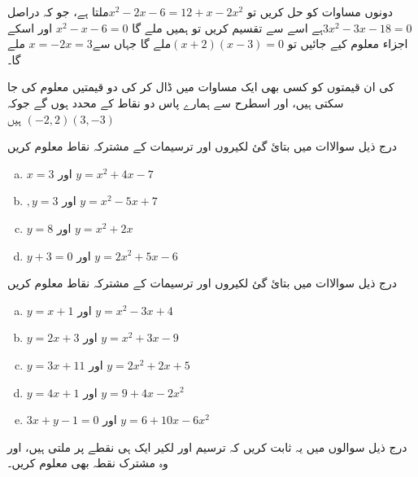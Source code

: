 دونوں مساوات کو حل کریں تو \(   x^{2}-2x-6=12+x-2x^{2}  \)ملتا ہے، جو کہ دراصل \(     3x^{2}-3x-18=0   \)ہے  اسے سے تقسیم کریں تو ہمیں ملے گا \(        x^{2}-x-6=0   \) اور اسکے اجزاء معلوم کیے جائیں تو   \(        (x+2)(x-3)=0   \)ملے گا جہاں سے\(            x=-2    x=3\) ملے گا۔

کی ان قیمتوں کو کسی بھی ایک مساوات میں ڈال کر  کی دو قیمتیں معلوم کی جا سکتی ہیں، اور اسطرح سے ہمارے پاس دو نقاط کے محدد ہوں گے جوکہ \((-2,2)(3,-3)\) ہیں


درج ذیل سوالاات میں بتائ گئ لکیروں اور ترسیمات  کے مشترکہ نقاط معلوم کریں
\begin{multicols}{2}
\begin{enumerate}[a.]
\item \(    x=3     \)           اور  \(  y=x^{2}+4x-7 \)
\item \(,y=3  \) اور  \(  y=x^{2}-5x+7 \)
\item \( y=8\) اور  \(  y=x^{2}+2x \)
\item \( y+3=0 \) اور  \( y=2x^{2}+5x-6 \)
 \end{enumerate}
\end{multicols}

درج ذیل سوالاات میں بتائ گئ لکیروں اور ترسیمات  کے مشترکہ نقاط معلوم کریں
\begin{multicols}{2}
\begin{enumerate}[a.]
\item \(  y=x+1    \)           اور  \(  y=x^{2}-3x+4 \)
\item \(y=2x+3 \) اور  \(   y=x^{2}+3x-9 \)
\item \( y=3x+11\) اور  \(  y=2x^{2}+2x+5 \)
\item \( y=4x+1  \) اور  \(y=9+4x-2x^{2} \)
\item \( 3x+y-1=0 \) اور  \(  y=6+10x-6x^{2} \)
 \end{enumerate}
\end{multicols}
درج ذیل سوالوں میں یہ ثابت کریں کہ ترسیم اور لکیر ایک ہی نقطے پر ملتی ہیں، اور وہ مشترک نقطہ بھی معلوم کریں۔
 
